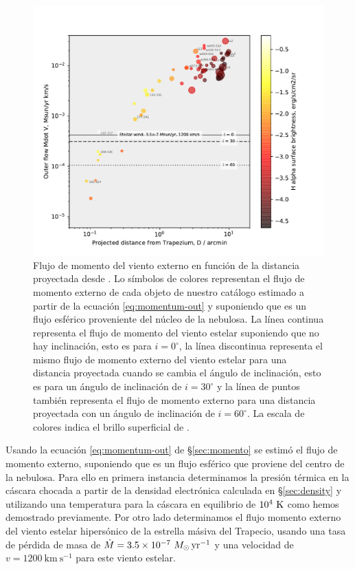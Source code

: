 \begin{figure}
  \centering
  \includegraphics[width=\linewidth, clip]{luis-programas/will-MdotVout-vs-D.pdf}
  \caption{Flujo de momento del viento externo en función de la distancia proyectada desde \thC{}. Lo símbolos de colores representan el flujo de momento externo de cada objeto de nuestro catálogo estimado a partir de la ecuación \ref{eq:momentum-out} y suponiendo que es un flujo esférico proveniente del núcleo de la nebulosa. La línea continua representa el flujo de momento del viento estelar  suponiendo que no hay inclinación, esto es para \(i = 0^{\circ}\), la línea discontinua representa el mismo flujo de momento externo del viento estelar para una distancia proyectada cuando se cambia el ángulo de inclinación, esto es para un ángulo de inclinación de \(i = 30^{\circ}\) y la línea de puntos también representa el flujo de momento externo para una distancia proyectada con un ángulo de inclinación de \(i = 60^{\circ}\). La escala de colores indica el brillo superficial de \ha{}.}
 \label{fig:pressure}
\end{figure}

Usando la ecuación \ref{eq:momentum-out} de \S\ref{sec:momento} se estimó el flujo de momento externo, suponiendo que es un flujo esférico que proviene del centro de la nebulosa. Para ello en primera instancia determinamos la presión térmica en la cáscara chocada a partir de la densidad electrónica calculada en \S\ref{sec:density} y utilizando una temperatura para la cáscara en equilibrio de \(10^{4}~\mathrm{K}\) como hemos demostrado previamente. Por otro lado determinamos el flujo momento externo del viento estelar hipersónico de la estrella másiva \thC{} del Trapecio, usando una tasa de pérdida de masa de \(\dot{M} = 3.5 \times 10^{-7}~M_\odot\,\mathrm{yr^{-1}}\) y una velocidad de \(v = 1200~\mathrm{km~s^{-1}}\) para este viento estelar. \\


